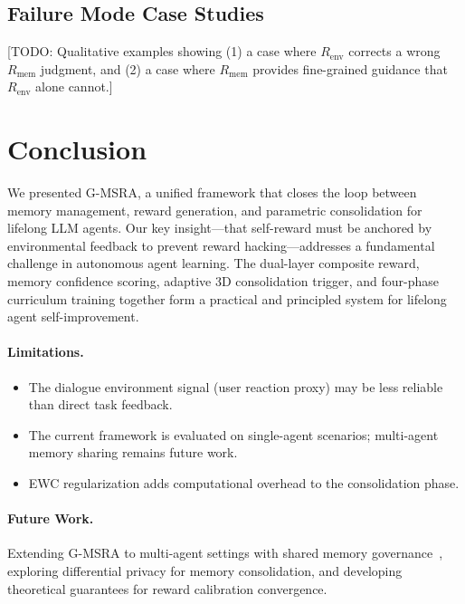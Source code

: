 \documentclass{article}
\newcommand{\gmsra}{\textsc{G-MSRA}}
\newcommand{\renv}{R_{\mathrm{env}}}
\newcommand{\rmem}{R_{\mathrm{mem}}}
\begin{document}
\subsection{Failure Mode Case Studies}

[TODO: Qualitative examples showing (1) a case where $\renv$ corrects a wrong $\rmem$ judgment, and (2) a case where $\rmem$ provides fine-grained guidance that $\renv$ alone cannot.]


\section{Conclusion}
\label{sec:conclusion}

We presented \gmsra{}, a unified framework that closes the loop between memory management, reward generation, and parametric consolidation for lifelong LLM agents. Our key insight---that self-reward must be anchored by environmental feedback to prevent reward hacking---addresses a fundamental challenge in autonomous agent learning. The dual-layer composite reward, memory confidence scoring, adaptive 3D consolidation trigger, and four-phase curriculum training together form a practical and principled system for lifelong agent self-improvement.

\paragraph{Limitations.}
\begin{itemize}[nosep, leftmargin=*]
    \item The dialogue environment signal (user reaction proxy) may be less reliable than direct task feedback.
    \item The current framework is evaluated on single-agent scenarios; multi-agent memory sharing remains future work.
    \item EWC regularization adds computational overhead to the consolidation phase.
\end{itemize}

\paragraph{Future Work.}
Extending \gmsra{} to multi-agent settings with shared memory governance~\citep{mirix2025, memos2025}, exploring differential privacy for memory consolidation, and developing theoretical guarantees for reward calibration convergence.
\end{document}
